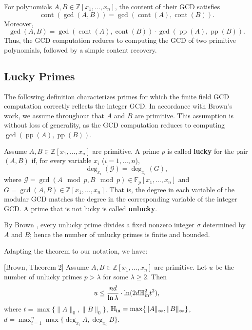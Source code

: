 \documentclass{article}
\numberwithin{equation}{section}
\begin{document}

For polynomials $A, B \in \mathbb{Z}[x_1, \dots, x_n]$, the content of their GCD satisfies
\[
\operatorname{cont}(\gcd(A, B)) = \gcd(\operatorname{cont}(A), \operatorname{cont}(B)).
\]
Moreover,
\[
\gcd(A, B) = \gcd(\operatorname{cont}(A), \operatorname{cont}(B)) \cdot \gcd(\operatorname{pp}(A), \operatorname{pp}(B)).
\]
Thus, the GCD computation reduces to computing the GCD of two primitive polynomials, followed by a simple content recovery.

\subsection*{Lucky Primes}

The following definition characterizes primes for which the finite field GCD computation correctly reflects the integer GCD. In accordance with Brown's work, we assume throughout that $A$ and $B$ are primitive. This assumption is without loss of generality, as the GCD computation reduces to computing $\gcd(\operatorname{pp}(A), \operatorname{pp}(B))$.

\begin{definition}
Assume $A,B\in \mathbb{Z}[x_1, \dots, x_n]$ are primitive. A prime $p$ is called \textbf{lucky} for the pair $(A, B)$ if, for every variable $x_i$ ($i=1,\dots,n$),
\[
\deg_{x_i}(\mathcal{G}) = \deg_{x_i}(G),
\]
where $\mathcal{G} = \gcd(A \mod p, B \mod p) \in \mathbb{F}_p[x_1, \dots, x_n]$ and $G = \gcd(A,B) \in \mathbb{Z}[x_1, \dots, x_n]$. 
That is, the degree in each variable of the modular GCD matches the degree in the corresponding variable of the integer GCD. A prime that is not lucky is called \textbf{unlucky}.
\end{definition}

By Brown \cite{brown1971}, every unlucky prime divides a fixed nonzero integer $\sigma$ determined by $A$ and $B$; hence the number of unlucky primes is finite and bounded. 

Adapting the theorem to our notation, we have:

\begin{theorem}\label{Brownthe2}[Brown, Theorem 2]\cite{brown1971} Assume $A,B\in \mathbb{Z}[x_1, \dots, x_n]$ are primitive. 
Let $u$ be the number of unlucky primes $p > \lambda$ for some $\lambda \ge 2$. Then
\[
u \le \frac{nd}{\ln \lambda} \cdot \ln(2d \mathbb{H}_{\rm in}^2 t^2),
\]
where $t = \max\{\|A\|_0, \|B\|_0\}$, $\mathbb{H}_{\rm in}=\max\{\|A\|_{\infty},\|B\|_{\infty}\}$, $d=\max_{i=1}^n\max\{\deg_{x_i} A,\deg_{x_i} B\}$.
\end{theorem}
\end{document}
